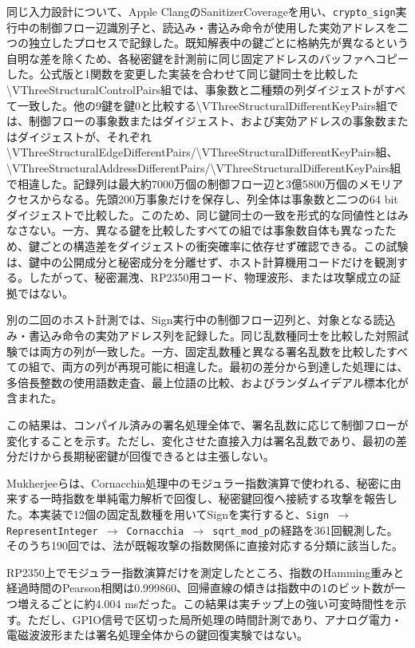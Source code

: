 \documentclass[a4paper,10pt]{ltjsarticle}
\theoremstyle{definition}
\theoremstyle{remark}
\begin{document}
同じ入力設計について、Apple ClangのSanitizerCoverageを用い、\texttt{crypto\_sign}実行中の制御フロー辺識別子と、読込み・書込み命令が使用した実効アドレスを二つの独立したプロセスで記録した。既知解表中の鍵ごとに格納先が異なるという自明な差を除くため、各秘密鍵を計測前に同じ固定アドレスのバッファへコピーした。公式版と1関数を変更した実装を合わせて同じ鍵同士を比較した\num{\VThreeStructuralControlPairs}組では、事象数と二種類の列ダイジェストがすべて一致した。他の9鍵を鍵0と比較する\num{\VThreeStructuralDifferentKeyPairs}組では、制御フローの事象数またはダイジェスト、および実効アドレスの事象数またはダイジェストが、それぞれ\num{\VThreeStructuralEdgeDifferentPairs}/\num{\VThreeStructuralDifferentKeyPairs}組、\num{\VThreeStructuralAddressDifferentPairs}/\num{\VThreeStructuralDifferentKeyPairs}組で相違した。記録列は最大約7000万個の制御フロー辺と3億5800万個のメモリアクセスからなる。先頭200万事象だけを保存し、列全体は事象数と二つの64 bitダイジェストで比較した。このため、同じ鍵同士の一致を形式的な同値性とはみなさない。一方、異なる鍵を比較したすべての組では事象数自体も異なったため、鍵ごとの構造差をダイジェストの衝突確率に依存せず確認できる。この試験は、鍵中の公開成分と秘密成分を分離せず、ホスト計算機用コードだけを観測する。したがって、秘密漏洩、RP2350用コード、物理波形、または攻撃成立の証拠ではない。

別の二回のホスト計測では、Sign実行中の制御フロー辺列と、対象となる読込み・書込み命令の実効アドレス列を記録した。同じ乱数種同士を比較した対照試験では両方の列が一致した。一方、固定乱数種と異なる署名乱数を比較したすべての組で、両方の列が再現可能に相違した。最初の差分から到達した処理には、多倍長整数の使用語数走査、最上位語の比較、およびランダムイデアル標本化が含まれた。

この結果は、コンパイル済みの署名処理全体で、署名乱数に応じて制御フローが変化することを示す。ただし、変化させた直接入力は署名乱数であり、最初の差分だけから長期秘密鍵が回復できるとは主張しない。

Mukherjeeらは、Cornacchia処理中のモジュラー指数演算で使われる、秘密に由来する一時指数を単純電力解析で回復し、秘密鍵回復へ接続する攻撃を報告した\cite{spa-2025}。本実装で12個の固定乱数種を用いてSignを実行すると、\texttt{Sign $\rightarrow$ RepresentInteger $\rightarrow$ Cornacchia $\rightarrow$ sqrt\_mod\_p}の経路を361回観測した。そのうち190回では、法が既報攻撃の指数関係に直接対応する分類に該当した。

RP2350上でモジュラー指数演算だけを測定したところ、指数のHamming重みと経過時間のPearson相関は\num{0.999860}、回帰直線の傾きは指数中の1のビット数が一つ増えるごとに約\num{4.004} msだった。この結果は実チップ上の強い可変時間性を示す。ただし、GPIO信号で区切った局所処理の時間計測であり、アナログ電力・電磁波波形または署名処理全体からの鍵回復実験ではない。
\end{document}
